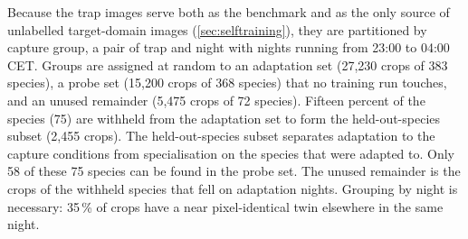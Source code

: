 Because the trap images serve both as the benchmark and as the only source of unlabelled target-domain images (\cref{sec:selftraining}), they are partitioned by capture group, a pair of trap and night with nights running from 23:00 to 04:00 CET.
Groups are assigned at random to an adaptation set (27,230 crops of 383 species), a probe set (15,200 crops of 368 species) that no training run touches, and an unused remainder (5,475 crops of 72 species).
Fifteen percent of the species (75) are withheld from the adaptation set to form the held-out-species subset (2,455 crops). 
The held-out-species subset separates adaptation to the capture conditions from specialisation on the species that were adapted to.
Only 58 of these 75 species can be found in the probe set.
The unused remainder is the crops of the withheld species that fell on adaptation nights.
Grouping by night is necessary: 35\,\% of crops have a near pixel-identical twin elsewhere in the same night.
